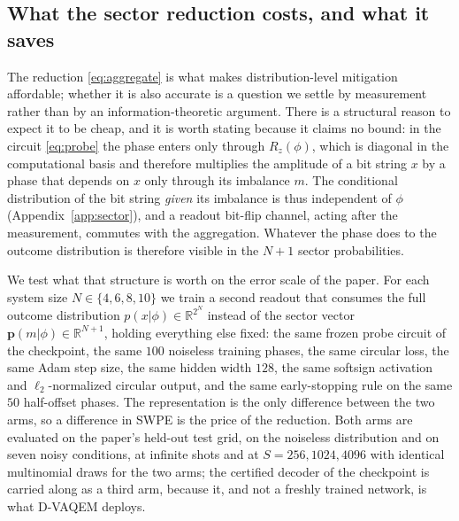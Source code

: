 \documentclass[ASNA,twocolumn]{USG}
\newcommand{\pvec}{\mathbf{p}}
\newcommand{\dvaqem}{D-VAQEM}
\begin{document}
\subsection{What the sector reduction costs, and what it saves}
\label{subsec:sufficiency}
\label{sec:setup}

The reduction \eqref{eq:aggregate} is what makes distribution-level mitigation
affordable; whether it is also accurate is a question we settle by measurement
rather than by an information-theoretic argument.  There is a structural reason
to expect it to be cheap, and it is worth stating because it claims no bound: in
the circuit \eqref{eq:probe} the phase enters only through $R_z(\phi)$, which is
diagonal in the computational basis and therefore multiplies the amplitude of a
bit string $x$ by a phase that depends on $x$ only through its imbalance $m$.
The conditional distribution of the bit string \emph{given} its imbalance is thus
independent of $\phi$ (Appendix~\ref{app:sector}), and a readout bit-flip
channel, acting after the measurement, commutes with the aggregation.  Whatever
the phase does to the outcome distribution is therefore visible in the $N+1$
sector probabilities.

We test what that structure is worth on the error scale of the paper.  For each
system size $N\in\{4,6,8,10\}$ we train a second readout that consumes the full
outcome distribution $p(x|\phi)\in\mathbb R^{2^N}$ instead of the sector vector
$\pvec(m|\phi)\in\mathbb R^{N+1}$, holding everything else fixed: the same frozen
probe circuit of the checkpoint, the same $100$ noiseless training phases, the
same circular loss, the same Adam step size, the same hidden width $128$, the
same softsign activation and $\ell_2$-normalized circular output, and the same
early-stopping rule on the same $50$ half-offset phases.  The representation is
the only difference between the two arms, so a difference in SWPE is the price of
the reduction.  Both arms are evaluated on the paper's held-out test grid, on the
noiseless distribution and on seven noisy conditions, at infinite shots and at
$S=256,1024,4096$ with identical multinomial draws for the two arms; the
certified decoder of the checkpoint is carried along as a third arm, because it,
and not a freshly trained network, is what \dvaqem{} deploys.
\end{document}
